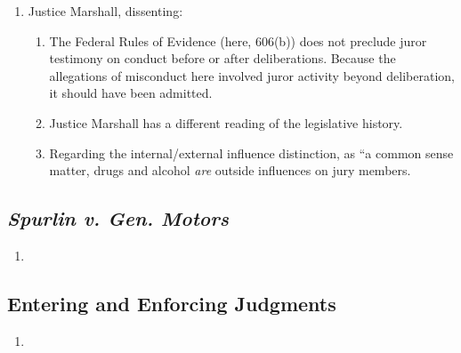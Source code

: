 \begin{enumerate}
\begin{enumerate}
    \end{enumerate}
    \item Justice Marshall, dissenting:
    \begin{enumerate}
        \item The Federal Rules of Evidence (here, 606(b)) does not preclude juror testimony on conduct before or after deliberations. Because the allegations of misconduct here involved juror activity beyond deliberation, it should have been admitted.
        \item Justice Marshall has a different reading of the legislative history.
        \item Regarding the internal/external influence distinction, as ``a common sense matter, drugs and alcohol \emph{are} outside influences on jury members.
    \end{enumerate}
\end{enumerate}

\subsection{\emph{Spurlin v. Gen. Motors}}

\begin{enumerate}
    \item 
\end{enumerate}

\subsection{Entering and Enforcing Judgments}

\begin{enumerate}
    \item 
\end{enumerate}


